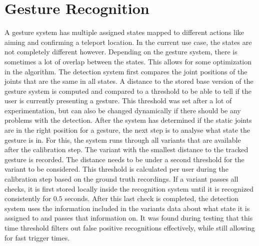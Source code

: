 \section{Gesture Recognition}
A gesture system has multiple assigned states mapped to different actions like aiming and confirming a teleport location. In the current use case, the states are not completely different however. Depending on the gesture system, there is sometimes a lot of overlap between the states. This allows for some optimization in the algorithm. The detection system first compares the joint positions of the joints that are the same in all states. A distance to the stored base version of the gesture system is computed and compared to a threshold to be able to tell if the user is currently presenting a gesture. This threshold was set after a lot of experimentation, but can also be changed dynamically if there should be any problems with the detection. After the system has determined if the static joints are in the right position for a gesture, the next step is to analyse what state the gesture is in. For this, the system runs through all variants that are available after the calibration step. The variant with the smallest distance to the tracked gesture is recorded. The distance needs to be under a second threshold for the variant to be considered. This threshold is calculated per user during the calibration step based on the ground truth recordings. If a variant passes all checks, it is first stored locally inside the recognition system until it is recognized consistently for $0.5$ seconds. After this last check is completed, the detection system uses the information included in the variants data about what state it is assigned to and passes that information on. It was found during testing that this time threshold filters out false positive recognitions effectively, while still allowing for fast trigger times.
